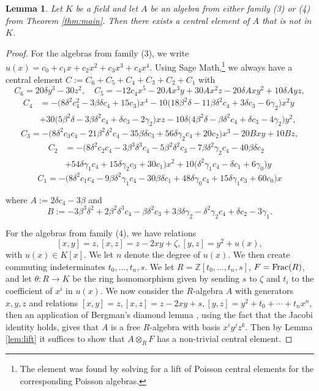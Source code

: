 \documentclass[a4paper,11pt,twoside,notitlepage,reqno]{amsart}
\theoremstyle{plain}
\numberwithin{thm}{section}
\newtheorem{lemma}[thm]{Lemma}
\theoremstyle{definition}
\begin{document}
\begin{lemma}\label{lem:34}
Let $K$ be a field and let $A$ be an algebra from either family (3) or (4) from Theorem \ref{thm:main}.  Then there exists a central element of $A$ that is not in $K$.
\end{lemma}
\begin{proof}
For the algebras from family (3), we write $u(x)=c_0+c_1x+c_2x^2+c_3x^3+c_4x^4$.  Using Sage Math,\footnote{The element was found by solving for a lift of Poisson central elements for the corresponding Poisson algebras.} we always have a central element
$C:=C_6+C_5+C_4+C_3+C_2+C_1$ with
$$C_6=20\delta y^3-30z^2, \quad C_5= -12c_4x^5-20Ax^3y+30Ax^2z-20\delta Axy^2+10\delta A yz,$$
\begin{align*} C_4 &=-\big(8\delta^2c_4^2-3\beta\delta c_4+15c_3\big)x^4-10\big(18\beta^2\delta-11\beta\delta^2c_4+3\delta c_3-6\gamma_2\big)x^2y\\
&+30\big(5\beta^2\delta-3\beta\delta^2c_4+\delta c_3-2\gamma_2\big)xz-10\delta\big(4\beta^2\delta-\beta\delta^2c_4+\delta c_3-4\gamma_2\big)y^2,\end{align*}
$$C_3=-\big(8\delta^2c_3c_4-21\beta^2\delta^2c_4-35\beta\delta c_3+56\delta\gamma_2c_4+20c_2\big)x^3-20Bxy+10Bz,$$
\begin{align*} C_2 &=-\big(8\delta^2c_2c_4-3\beta^3\delta^3c_4-5\beta^2\delta^2c_3-7\beta\delta^2\gamma_2c_4-40\beta\delta c_2\\
&+54\delta\gamma_1c_4+15\delta\gamma_2c_3+30c_1\big)x^2 +10\big(\delta^2\gamma_1c_4-\delta c_1+6\gamma_0\big)y\end{align*}
$$C_1=-\big(8\delta^2c_1c_4-9\beta\delta^2\gamma_1c_4-30\beta\delta c_1+48\delta\gamma_0c_4+15\delta\gamma_1c_3+60c_0\big)x$$

where $A:=2\delta c_4-3\beta$ and $$B:=-3\beta^3\delta^2+2\beta^2\delta^3c_4-\beta\delta^2c_3+3\beta\delta\gamma_2-\delta^2\gamma_2c_4+\delta c_2-3\gamma_1.$$


For the algebras from family (4), we have relations
$$[x,y]=z, [x,z]= z -2 xy +\zeta, [y,z]= y^2 +u(x),$$
with $u(x)\in K[x]$.  We let $n$ denote the degree of $u(x)$.  We then create commuting indeterminates $t_0,\ldots ,t_n, s$. We let
$R=\mathbb{Z}[t_0,\ldots ,t_n,s]$, $F={\rm Frac}(R)$, and let $\theta: R\to K$ be the ring homomorphism given by sending $s$ to $\zeta$ and $t_i$ to the coefficient of $x^i$ in $u(x)$. We now consider the $R$-algebra $A$ with generators $x,y,z$ and relations
$[x,y]=z, [x,z]=z-2xy+s, [y,z] = y^2+t_0 + \cdots +t_n x^n$, then an application of Bergman's diamond lemma \cite{Berg}, using the fact that the Jacobi identity holds, gives that $A$ is a free $R$-algebra with basis $x^i y^j z^k$.  Then by Lemma \ref{lem:lift} it suffices to show that $A\otimes_R F$ has a non-trivial central element.


\end{proof}
\end{document}
